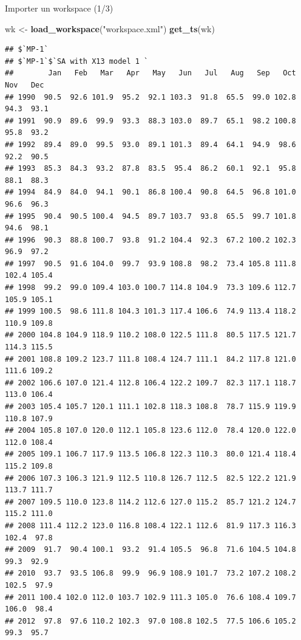 \documentclass[10pt,xcolor=table,color={dvipsnames,usenames},ignorenonframetext,usepdftitle=false,french]{beamer}
\newenvironment{Shaded}{\begin{snugshade}}{\end{snugshade}}
\newcommand{\KeywordTok}[1]{\textcolor[rgb]{0.13,0.29,0.53}{\textbf{#1}}}
\newcommand{\NormalTok}[1]{#1}
\newcommand{\StringTok}[1]{\textcolor[rgb]{0.31,0.60,0.02}{#1}}
\begin{document}
\begin{frame}[fragile]{Importer un workspace (1/3)}
\protect\hypertarget{importer-un-workspace-13}{}

\footnotesize

\begin{Shaded}
\begin{Highlighting}[]
\NormalTok{wk <-}\StringTok{ }\KeywordTok{load_workspace}\NormalTok{(}\StringTok{"workspace.xml"}\NormalTok{)}
\KeywordTok{get_ts}\NormalTok{(wk)}
\end{Highlighting}
\end{Shaded}

\begin{verbatim}
## $`MP-1`
## $`MP-1`$`SA with X13 model 1 `
##        Jan   Feb   Mar   Apr   May   Jun   Jul   Aug   Sep   Oct   Nov   Dec
## 1990  90.5  92.6 101.9  95.2  92.1 103.3  91.8  65.5  99.0 102.8  94.3  93.1
## 1991  90.9  89.6  99.9  93.3  88.3 103.0  89.7  65.1  98.2 100.8  95.8  93.2
## 1992  89.4  89.0  99.5  93.0  89.1 101.3  89.4  64.1  94.9  98.6  92.2  90.5
## 1993  85.3  84.3  93.2  87.8  83.5  95.4  86.2  60.1  92.1  95.8  88.1  88.3
## 1994  84.9  84.0  94.1  90.1  86.8 100.4  90.8  64.5  96.8 101.0  96.6  96.3
## 1995  90.4  90.5 100.4  94.5  89.7 103.7  93.8  65.5  99.7 101.8  94.6  98.1
## 1996  90.3  88.8 100.7  93.8  91.2 104.4  92.3  67.2 100.2 102.3  96.9  97.2
## 1997  90.5  91.6 104.0  99.7  93.9 108.8  98.2  73.4 105.8 111.8 102.4 105.4
## 1998  99.2  99.0 109.4 103.0 100.7 114.8 104.9  73.3 109.6 112.7 105.9 105.1
## 1999 100.5  98.6 111.8 104.3 101.3 117.4 106.6  74.9 113.4 118.2 110.9 109.8
## 2000 104.8 104.9 118.9 110.2 108.0 122.5 111.8  80.5 117.5 121.7 114.3 115.5
## 2001 108.8 109.2 123.7 111.8 108.4 124.7 111.1  84.2 117.8 121.0 111.6 109.2
## 2002 106.6 107.0 121.4 112.8 106.4 122.2 109.7  82.3 117.1 118.7 113.0 106.4
## 2003 105.4 105.7 120.1 111.1 102.8 118.3 108.8  78.7 115.9 119.9 110.8 107.9
## 2004 105.8 107.0 120.0 112.1 105.8 123.6 112.0  78.4 120.0 122.0 112.0 108.4
## 2005 109.1 106.7 117.9 113.5 106.8 122.3 110.3  80.0 121.4 118.4 115.2 109.8
## 2006 107.3 106.3 121.9 112.5 110.8 126.7 112.5  82.5 122.2 121.9 113.7 111.7
## 2007 109.5 110.0 123.8 114.2 112.6 127.0 115.2  85.7 121.2 124.7 115.2 111.0
## 2008 111.4 112.2 123.0 116.8 108.4 122.1 112.6  81.9 117.3 116.3 102.4  97.8
## 2009  91.7  90.4 100.1  93.2  91.4 105.5  96.8  71.6 104.5 104.8  99.3  92.9
## 2010  93.7  93.5 106.8  99.9  96.9 108.9 101.7  73.2 107.2 108.2 102.5  97.9
## 2011 100.4 102.0 112.0 103.7 102.9 111.3 105.0  76.6 108.4 109.7 106.0  98.4
## 2012  97.8  97.6 110.2 102.3  97.0 108.8 102.5  77.5 106.6 105.2  99.3  95.7

\end{verbatim}
\end{frame}
\end{document}

